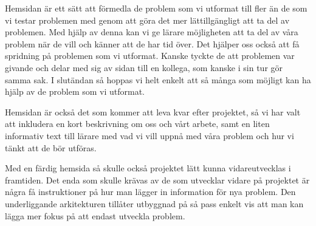 \textcolor{Mahogany}{Hemsidan är ett sätt att förmedla de problem som vi utformat till fler än de som vi testar problemen med genom att göra det mer lättillgängligt att ta del av problemen. Med hjälp av denna kan vi ge lärare möjligheten att ta del av våra problem när de vill och känner att de har tid över. Det hjälper oss också att få spridning på problemen som vi utformat. Kanske tyckte de att problemen var givande och delar med sig av sidan till en kollega, som kanske i sin tur gör samma sak. I slutändan så hoppas vi helt enkelt att så många som möjligt kan ha hjälp av de problem som vi utformat.}

\textcolor{Mahogany}{Hemsidan är också det som kommer att leva kvar efter projektet, så vi har valt att inkludera en kort beskrivning om oss och vårt arbete, samt en liten informativ text till lärare med vad vi vill uppnå med våra problem och hur vi tänkt att de bör utföras.}

\textcolor{WildStrawberry}{
    Med en färdig hemsida så skulle också projektet lätt kunna vidareutvecklas i framtiden. Det enda som skulle krävas av de som utvecklar vidare på projektet är några få instruktioner på hur man lägger in information för nya problem. Den underliggande arkitekturen tillåter utbyggnad på så pass enkelt vis att man kan lägga mer fokus på att endast utveckla problem.
    }